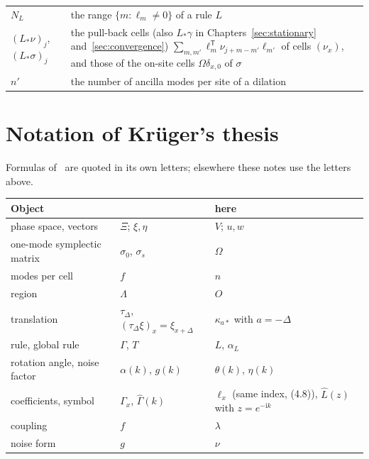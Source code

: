\documentclass[11pt]{article}
\numberwithin{equation}{section}
\theoremstyle{definition}
\theoremstyle{remark}
\theoremstyle{plain}
\newcommand{\ii}{\mathrm i}
\newcommand{\reve}[1]{#1}
\begin{document}
\begin{center}
\begin{tabular}{@{}l>{\raggedright\arraybackslash}p{}@{}}
\reve{$N_L$} & \reve{the range $\{m:\ell_m\neq0\}$ of a rule $L$} \\
\reve{$(L_*\nu)_j$, $(L_*\sigma)_j$} & \reve{the pull-back cells (also $L_*\gamma$ in Chapters~\ref{sec:stationary} and~\ref{sec:convergence}) $\sum_{m,m'}\ell_m^{\mathsf T}\nu_{j+m-m'}\ell_{m'}$ of cells $(\nu_x)$, and those of the on-site cells $\Omega\delta_{x,0}$ of $\sigma$} \\
\reve{$n'$} & \reve{the number of ancilla modes per site of a dilation}
\end{tabular}
\end{center}

\section*{Notation of Kr\"uger's thesis}
\noindent Formulas of~\cite{krueger} are quoted in its own letters; elsewhere these notes use
the letters above.
\begin{center}\small
\begin{tabular}{@{}lll@{}}
\toprule
Object & \cite{krueger} & here \\
\midrule
phase space, vectors & $\Xi$; $\xi,\eta$ & $V$; $u,w$ \\
one-mode symplectic matrix & $\sigma_0$, $\sigma_s$ & $\Omega$ \\
modes per cell & $f$ & $n$ \\
region & $\Lambda$ & $O$ \\
translation & $\tau_\Delta$, $(\tau_\Delta\xi)_x=\xi_{x+\Delta}$ & $\kappa_{a*}$ with $a=-\Delta$ \\
rule, global rule & $\Gamma$, $T$ & $L$, $\alpha_L$ \\
\reve{rotation angle, noise factor} & \reve{$\alpha(k)$, $g(k)$} & \reve{$\theta(k)$, $\eta(k)$} \\
coefficients, symbol & $\Gamma_x$, $\hat\Gamma(k)$ & $\ell_x$ (same index, (4.8)), $\hat L(z)$ with $z=e^{-\ii k}$ \\
coupling & $f$ & $\lambda$ \\
noise form & $g$ & $\nu$ \\
\bottomrule
\end{tabular}
\end{center}












\end{document}
